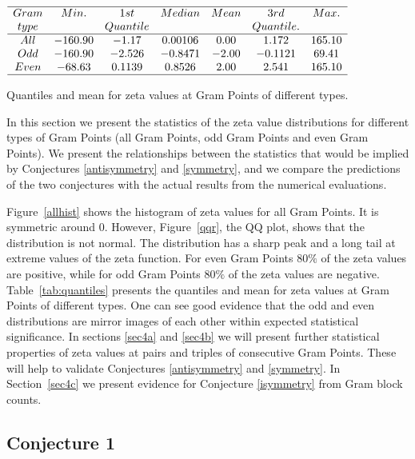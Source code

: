 \documentclass[twoside]{article}
\begin{document}
\begin{table}
\centering \(\begin{array}{ccccccc}
\hline
 Gram &     Min.   & 1st    &  Median    &   Mean   & 3rd    &   Max. \\
 type &              & Quantile   &            &              & Quantile.    &   \\
\hline
All& -160.90 &   -1.17 &    0.00106 &   0.00  &  1.172 &165.10\\
Odd&-160.90 &   -2.526 &   -0.8471  & -2.00 &   -0.1121 &  69.41 \\
Even&-68.63 &   0.1139 &  0.8526  & 2.00 &   2.541 & 165.10 \\
\hline
\end{array}\)
\caption{Quantiles and mean for zeta values at Gram Points of different types.} \label{tab:quantiles}
\end{table}

In this section we present the statistics of the zeta value distributions for different types of Gram Points (all Gram Points, odd Gram Points and even Gram Points). We present the relationships between the statistics that would be implied by Conjectures \ref{antisymmetry} and \ref{symmetry}, and we compare the predictions of the two conjectures with the actual results from the numerical evaluations. 

Figure~\ref{allhist} shows the histogram of zeta values for all Gram Points. It  is symmetric around $0$. However, Figure~\ref{qqr}, the QQ plot, shows that the distribution is not normal. The distribution has a sharp peak and a long tail at extreme values of the zeta function. For even Gram Points $80\%$ of the zeta values are positive, while for odd Gram Points $80\%$ of the zeta values are negative. Table~\ref{tab:quantiles} presents the quantiles and mean for zeta values at Gram Points of different types.  One can see good evidence that the odd and even distributions are mirror images of each other within expected statistical significance. In sections 
\ref{sec4a} and \ref{sec4b} we will present further statistical properties of zeta values at pairs and triples of consecutive Gram Points. These will help to validate Conjectures  \ref{antisymmetry} and  \ref{symmetry}. In Section~\ref{sec4c} we present evidence for  Conjecture  \ref{isymmetry} from Gram block counts.

\subsection{\label{sec4a}Conjecture 1}
\end{document}
